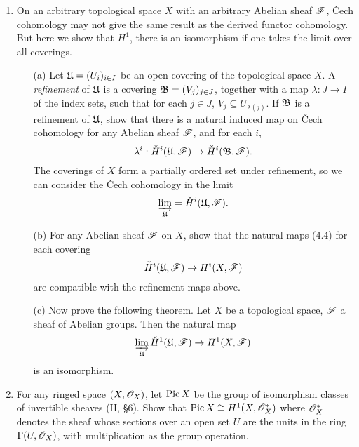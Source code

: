 \documentclass{article}
\begin{document}
\begin{enumerate} [label=\textbf{\arabic*.}, leftmargin=0em]
\item On an arbitrary topological space $X$ with an arbitrary Abelian sheaf $\mathscr{F}$, Čech cohomology may not give the same result as the derived functor cohomology.
But here we show that $H^1$, there is an isomorphism if one takes the limit over all coverings.
\begin{itemize}
  \item[(a)] Let $\mathfrak{U} = (U_i)_{i \in I}$ be an open covering of the topological space $X$.
  A \textit{refinement} of $\mathfrak{U}$ is a covering $\mathfrak{B} = (V_j)_{j \in J}$, together with a map $\lambda : J \to I$ of the index sets, such that for each $j \in J$, $V_j \subseteq U_{\lambda(j)}$.
  If $\mathfrak{B}$ is a refinement of $\mathfrak{U}$, show that there is a natural induced map on Čech cohomology for any Abelian sheaf $\mathscr{F}$, and for each $i$,
  \begin{equation*}
    \lambda^i : \check{H}^i(\mathfrak{U}, \mathscr{F}) \to \check{H}^i(\mathfrak{B}, \mathscr{F}).
  \end{equation*}
  The coverings of $X$ form a partially ordered set under refinement, so we can consider the Čech cohomology in the limit
  \begin{equation*}
    \varinjlim_{\mathfrak{U}} = \check{H}^i(\mathfrak{U}, \mathscr{F}).
  \end{equation*}

  \item[(b)]  For any Abelian sheaf $\mathscr{F}$ on $X$, show that the natural maps (4.4) for each covering
  \begin{equation*}
    \check{H}^i(\mathfrak{U}, \mathscr{F}) \to H^i(X, \mathscr{F})
  \end{equation*}
  are compatible with the refinement maps above.

  \item[(c)] Now prove the following theorem.
  Let $X$ be a topological space, $\mathscr{F}$ a sheaf of Abelian groups.
  Then the natural map
  \begin{equation*}
    \varinjlim_{\mathfrak{U}} \check{H}^1(\mathfrak{U}, \mathscr{F}) \to H^1(X, \mathscr{F})
  \end{equation*}
  is an isomorphism.
\end{itemize}

\item For any ringed space $(X, \mathscr{O}_X)$, let $\operatorname{Pic}{X}$ be the group of isomorphism classes of invertible sheaves (II, \S 6).
Show that $\operatorname{Pic}{X} \cong H^1(X, \mathscr{O}_X^*)$ where $\mathscr{O}_X^*$ denotes the sheaf whose sections over an open set $U$ are the units in the ring $\Gamma(U, \mathscr{O}_X)$, with multiplication as the group operation.

\end{enumerate}
\end{document}
